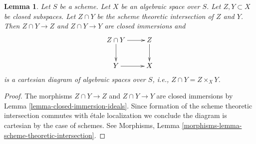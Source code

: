 \documentclass[10pt,a4paper]{amsart}
\theoremstyle{plain}
\newtheorem{lemma}[subsection]{Lemma}
\theoremstyle{definition}
\theoremstyle{remark}
\numberwithin{equation}{subsection}
\begin{document}
\begin{lemma}
\label{lemma-scheme-theoretic-intersection}
Let $S$ be a scheme. Let $X$ be an algebraic space over $S$.
Let $Z, Y \subset X$ be closed subspaces.
Let $Z \cap Y$ be the scheme theoretic intersection of $Z$ and $Y$.
Then $Z \cap Y \to Z$ and $Z \cap Y \to Y$ are closed immersions
and
$$
\xymatrix{
Z \cap Y \ar[r] \ar[d] & Z \ar[d] \\
Y \ar[r] & X
}
$$
is a cartesian diagram of algebraic spaces over $S$, i.e.,
$Z \cap Y = Z \times_X Y$.
\end{lemma}

\begin{proof}
The morphisms $Z \cap Y \to Z$ and $Z \cap Y \to Y$ are closed immersions
by Lemma \ref{lemma-closed-immersion-ideals}.
Since formation of the scheme theoretic intersection commutes
with \'etale localization we conclude the diagram is cartesian
by the case of schemes. See
Morphisms, Lemma \ref{morphisms-lemma-scheme-theoretic-intersection}.
\end{proof}
\end{document}
